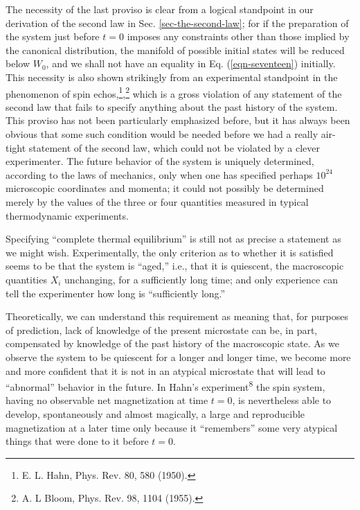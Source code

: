 \documentclass[twocolumn]{article}
\begin{document}
The necessity of the last proviso is clear from a logical standpoint in
our derivation of the second law in Sec. \ref{sec-the-second-law}; for if the preparation of
the system just before \(t = 0\) imposes any constraints other than
those implied by the canonical distribution, the manifold of possible
initial states will be reduced below \(W_{0}\), and we shall not have an
equality in Eq. (\ref{eqn-seventeen}) initially. This necessity is also shown strikingly
from an experimental standpoint in the phenomenon of spin
echos,\footnote{E. L. Hahn, Phys. Rev. 80, 580 (1950).},\footnote{A. L
  Bloom, Phys. Rev. 98, 1104 (1955).} which is a gross violation of any
statement of the second law that fails to specify anything about the
past history of the system. This proviso has not been particularly
emphasized before, but it has always been obvious that some such
condition would be needed before we had a really air-tight statement of
the second law, which could not be violated by a clever experimenter.
The future behavior of the system is uniquely determined, according to
the laws of mechanics, only when one has specified perhaps \(10^{24}\)
microscopic coordinates and momenta; it could not possibly be determined
merely by the values of the three or four quantities measured in typical
thermodynamic experiments.

Specifying ``complete thermal equilibrium'' is still not as precise a
statement as we might wish. Experimentally, the only criterion as to
whether it is satisfied seems to be that the system is ``aged,'' i.e.,
that it is quiescent, the macroscopic quantities \(X_{i}\) unchanging,
for a sufficiently long time; and only experience can tell the
experimenter how long is ``sufficiently long.''

Theoretically, we can understand this requirement as meaning that, for
purposes of prediction, lack of knowledge of the present microstate can
be, in part, compensated by knowledge of the past history of the
macroscopic state. As we observe the system to be quiescent for a longer
and longer time, we become more and more confident that it is not in an
atypical microstate that will lead to ``abnormal'' behavior in the
future. In Hahn's experiment\textsuperscript{8} the spin system, having
no observable net magnetization at time \(t = 0\), is nevertheless able
to develop, spontaneously and almost magically, a large and reproducible
magnetization at a later time only because it ``remembers'' some very
atypical things that were done to it before \(t = 0\).
\end{document}
